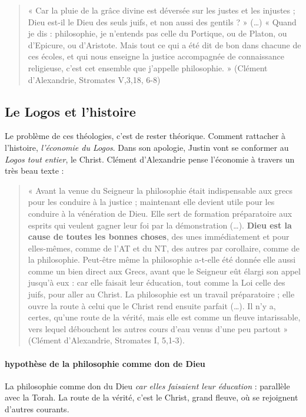 \begin{quote}
    « Car la pluie de la grâce divine est déversée sur les justes et les injustes ; Dieu est-il le Dieu
des seuls juifs, et non aussi des gentils ? » (…) « Quand je dis : philosophie, je n’entends pas
celle du Portique, ou de Platon, ou d’Epicure, ou d’Aristote. Mais tout ce qui a été dit de bon
dans chacune de ces écoles, et qui nous enseigne la justice accompagnée de connaissance
religieuse, c’est cet ensemble que j’appelle philosophie. » (Clément d’Alexandrie, Stromates
V,3,18, 6-8)
\end{quote}


\subsection{Le Logos et l’histoire} Le problème de ces théologies, c'est de rester théorique. Comment rattacher à l'histoire, \textit{l'économie du Logos}. Dans son apologie, Justin vont se conformer au \textit{Logos tout entier}, le Christ. Clément d'Alexandrie pense l'économie à travers un très beau texte : 



\begin{quote}
    « Avant la venue du Seigneur la philosophie était indispensable aux grecs pour les conduire à
la justice ; maintenant elle devient utile pour les conduire à la vénération de Dieu. Elle sert de
formation préparatoire aux esprits qui veulent gagner leur foi par la démonstration (…). \textbf{Dieu
est la cause de toutes les bonnes choses}, des unes immédiatement et pour elles-mêmes,
comme de l’AT et du NT, des autres par corollaire, comme de la philosophie. Peut-être même
la philosophie a-t-elle été donnée elle aussi comme un bien direct aux Grecs, avant que le
Seigneur eût élargi son appel jusqu’à eux : car elle faisait leur éducation, tout comme la Loi
celle des juifs, pour aller au Christ. La philosophie est un travail préparatoire ; elle ouvre la
route à celui que le Christ rend ensuite parfait (…). Il n’y a, certes, qu’une route de la vérité,
mais elle est comme un fleuve intarissable, vers lequel débouchent les autres cours d’eau
venus d’une peu partout » (Clément d’Alexandrie, Stromates I, 5,1-3).
\end{quote}

\paragraph{hypothèse de la philosophie comme don de Dieu}
 La philosophie comme don du Dieu \textit{car elles faisaient leur éducation} : parallèle avec la Torah. La route de la vérité, c'est le Christ, grand fleuve, où se rejoignent d'autres courants. 

